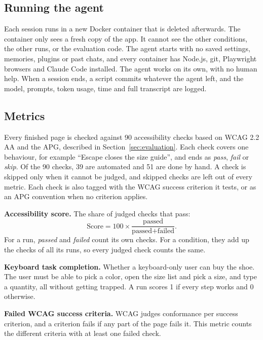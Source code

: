 \documentclass[conference]{IEEEtran}
\begin{document}
\subsection{Running the agent}

Each session runs in a new Docker container that is deleted afterwards. The container only sees a fresh copy of the app. It cannot see the other conditions, the other runs, or the evaluation code. The agent starts with no saved settings, memories, plugins or past chats, and every container has Node.js, git, Playwright browsers and Claude Code installed. The agent works on its own, with no human help. When a session ends, a script commits whatever the agent left, and the model, prompts, token usage, time and full transcript are logged.

\subsection{Metrics}

Every finished page is checked against 90 accessibility checks based on WCAG 2.2 AA and the APG, described in Section~\ref{sec:evaluation}. Each check covers one behaviour, for example ``Escape closes the size guide'', and ends as \emph{pass}, \emph{fail} or \emph{skip}. Of the 90 checks, 39 are automated and 51 are done by hand. A check is skipped only when it cannot be judged, and skipped checks are left out of every metric. Each check is also tagged with the WCAG success criterion it tests, or as an APG convention when no criterion applies.

\textbf{Accessibility score.} The share of judged checks that pass:
\begin{equation}
  \text{Score} = 100 \times \frac{\text{passed}}{\text{passed} + \text{failed}}.
\end{equation}
For a run, \textit{passed} and \textit{failed} count its own checks. For a condition, they add up the checks of all its runs, so every judged check counts the same.

\textbf{Keyboard task completion.} Whether a keyboard-only user can buy the shoe. The user must be able to pick a color, open the size list and pick a size, and type a quantity, all without getting trapped. A run scores 1 if every step works and 0 otherwise.

\textbf{Failed WCAG success criteria.} WCAG judges conformance per success criterion, and a criterion fails if any part of the page fails it. This metric counts the different criteria with at least one failed check.
\end{document}
